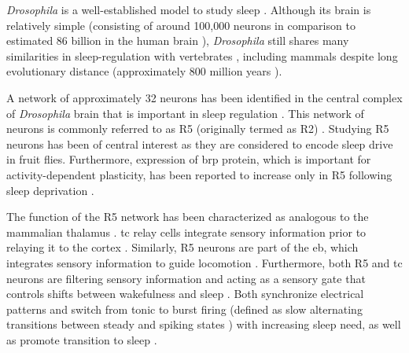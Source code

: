 \documentclass[../main.tex]{subfiles}
\begin{document}
\textit{Drosophila} is a well-established model to study sleep 
\parencite{liuSleepDriveEncoded2016,andreaniCircadianProgrammingEllipsoid2022,shaferRegulationDrosophilaSleep2021,dubowyCircadianRhythmsSleep2017}.
Although its brain is relatively simple (consisting of around 100,000 neurons \parencite{donleaRecurrentCircuitryBalancing2018} in comparison to
estimated 86 billion in the human brain \parencite{herculano-houzelRemarkableNotExtraordinary2012}), \textit{Drosophila} still
shares many similarities in sleep-regulation with vertebrates \parencite{liuSleepDriveEncoded2016}, including
mammals \parencite{suarez-grimaltNeuralArchitectureSleep2021,dubowyCircadianRhythmsSleep2017} despite long
evolutionary distance (approximately 800 million years \parencite{williamsLongReachNAAG2021}).

A network of approximately 32 neurons has been identified in the central complex of \textit{Drosophila} brain that is important in sleep regulation \cite{liuSleepDriveEncoded2016,raccugliaNetworkSpecificSynchronizationElectrical2019}. This network of neurons is commonly referred to as R5 (originally termed as R2) \cite{raccugliaNetworkSpecificSynchronizationElectrical2019}. Studying R5 neurons has been of central interest as they are considered to encode sleep drive in fruit flies. Furthermore, expression of \gls{brp} protein, which is important for activity-dependent plasticity, has been reported to increase only in R5 following sleep deprivation \cite{liuSleepDriveEncoded2016}.

The function of the R5 network has been characterized as analogous to the mammalian thalamus
\parencite{suarez-grimaltNeuralArchitectureSleep2021,raccugliaNetworkSpecificSynchronizationElectrical2019}.
\gls{tc} relay cells integrate sensory information prior to relaying it to the cortex \parencite{sampathkumarIntegrationSignalsDifferent2021}.
Similarly, R5 neurons are part of the \gls{eb}, which integrates sensory information to guide locomotion \parencite{yanSubtypeSpecificRolesEllipsoid2023}. 
Furthermore, both R5 and \gls{tc} neurons are filtering sensory information and acting as a
sensory gate that controls shifts between wakefulness and sleep
\parencite{raccugliaCoherentMultilevelNetwork2022,gentThalamicDualControl2018}. Both
synchronize electrical patterns and switch from tonic to burst firing (defined as slow alternating transitions between steady and spiking states
\parencite{rinzelFormalClassificationBursting1987}) with increasing sleep need, as well as promote transition to sleep
\parencite{suarez-grimaltNeuralArchitectureSleep2021, raccugliaNetworkSpecificSynchronizationElectrical2019}.
\end{document}
